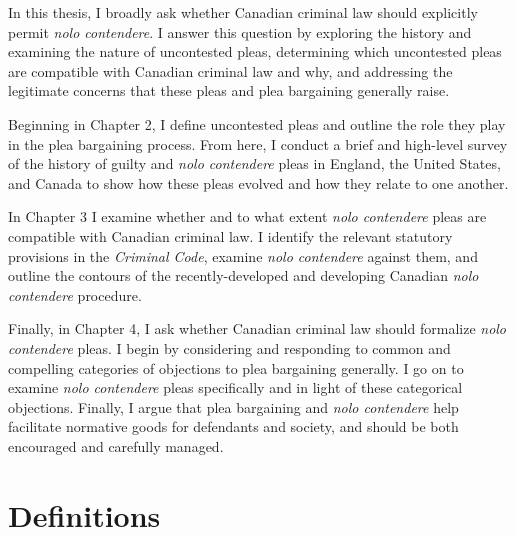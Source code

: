 In this thesis, I broadly ask whether Canadian criminal law should explicitly permit \textit{nolo contendere}. I answer this question by exploring the history and examining the nature of uncontested pleas, determining which uncontested pleas are compatible with Canadian criminal law and why, and addressing the legitimate concerns that these pleas and plea bargaining generally raise.

Beginning in Chapter 2, I define uncontested pleas and outline the role they play in the plea bargaining process. From here, I conduct a brief and high-level survey of the history of guilty and \textit{nolo contendere} pleas in England, the United States, and Canada to show how these pleas evolved and how they relate to one another. 

In Chapter 3 I examine whether and to what extent \textit{nolo contendere} pleas are compatible with Canadian criminal law. I identify the relevant statutory provisions in the \textit{Criminal Code}, examine \textit{nolo contendere} against them, and outline the contours of the recently-developed and developing Canadian \textit{nolo contendere} procedure.

Finally, in Chapter 4, I ask whether Canadian criminal law should formalize \textit{nolo contendere} pleas. I begin by considering and responding to common and compelling categories of objections to plea bargaining generally. I go on to examine \textit{nolo contendere} pleas specifically and in light of these categorical objections. Finally, I argue that plea bargaining and \textit{nolo contendere} help facilitate normative goods for defendants and society, and should be both encouraged and carefully managed.
\newpage
\section{Definitions}

